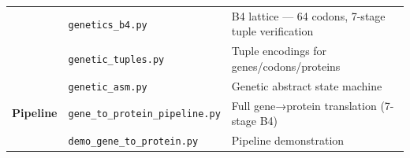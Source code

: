 \documentclass[12pt,a4paper]{article}
\begin{document}
\begin{longtable}[]{@{}lll@{}}
\begin{minipage}[t]{0.23\columnwidth}
\strut
\end{minipage} & \begin{minipage}[t]{0.26\columnwidth}\raggedright
\texttt{genetics\_b4.py}\strut
\end{minipage} & \begin{minipage}[t]{0.42\columnwidth}\raggedright
B4 lattice --- 64 codons, 7-stage tuple verification\strut
\end{minipage}\tabularnewline
\begin{minipage}[t]{0.23\columnwidth}\raggedright
\strut
\end{minipage} & \begin{minipage}[t]{0.26\columnwidth}\raggedright
\texttt{genetic\_tuples.py}\strut
\end{minipage} & \begin{minipage}[t]{0.42\columnwidth}\raggedright
Tuple encodings for genes/codons/proteins\strut
\end{minipage}\tabularnewline
\begin{minipage}[t]{0.23\columnwidth}\raggedright
\strut
\end{minipage} & \begin{minipage}[t]{0.26\columnwidth}\raggedright
\texttt{genetic\_asm.py}\strut
\end{minipage} & \begin{minipage}[t]{0.42\columnwidth}\raggedright
Genetic abstract state machine\strut
\end{minipage}\tabularnewline
\begin{minipage}[t]{0.23\columnwidth}\raggedright
\textbf{Pipeline}\strut
\end{minipage} & \begin{minipage}[t]{0.26\columnwidth}\raggedright
\texttt{gene\_to\_protein\_pipeline.py}\strut
\end{minipage} & \begin{minipage}[t]{0.42\columnwidth}\raggedright
Full gene→protein translation (7-stage B4)\strut
\end{minipage}\tabularnewline
\begin{minipage}[t]{0.23\columnwidth}\raggedright
\strut
\end{minipage} & \begin{minipage}[t]{0.26\columnwidth}\raggedright
\texttt{demo\_gene\_to\_protein.py}\strut
\end{minipage} & \begin{minipage}[t]{0.42\columnwidth}\raggedright
Pipeline demonstration\strut
\end{minipage}\tabularnewline

\end{longtable}
\end{document}
